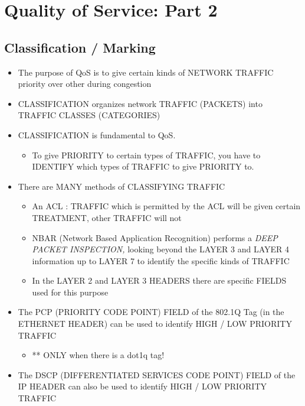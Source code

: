 \chapter{Quality of Service: Part 2}\label{quality-of-service-part-2}

\section{Classification / Marking}\label{classification-marking}

\begin{itemize}
\tightlist
\item
  The purpose of QoS is to give certain kinds of NETWORK TRAFFIC
  priority over other during congestion
\item
  CLASSIFICATION organizes network TRAFFIC (PACKETS) into TRAFFIC
  CLASSES (CATEGORIES)
\item
  CLASSIFICATION is fundamental to QoS.

  \begin{itemize}
  \tightlist
  \item
    To give PRIORITY to certain types of TRAFFIC, you have to IDENTIFY
    which types of TRAFFIC to give PRIORITY to.
  \end{itemize}
\item
  There are MANY methods of CLASSIFYING TRAFFIC

  \begin{itemize}
  \tightlist
  \item
    An ACL : TRAFFIC which is permitted by the ACL will be given certain
    TREATMENT, other TRAFFIC will not
  \item
    NBAR (Network Based Application Recognition) performs a \emph{DEEP
    PACKET INSPECTION,} looking beyond the LAYER 3 and LAYER 4
    information up to LAYER 7 to identify the specific kinds of TRAFFIC
  \item
    In the LAYER 2 and LAYER 3 HEADERS there are specific FIELDS used
    for this purpose
  \end{itemize}
\item
  The PCP (PRIORITY CODE POINT) FIELD of the 802.1Q Tag (in the ETHERNET
  HEADER) can be used to identify HIGH / LOW PRIORITY TRAFFIC

  \begin{itemize}
  \tightlist
  \item
    ** ONLY when there is a dot1q tag!
  \end{itemize}
\item
  The DSCP (DIFFERENTIATED SERVICES CODE POINT) FIELD of the IP HEADER
  can also be used to identify HIGH / LOW PRIORITY TRAFFIC
\end{itemize}

